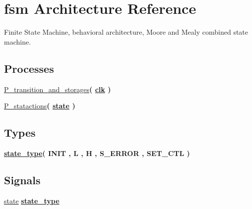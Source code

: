 \hypertarget{classstop__generator_1_1fsm}{}\section{fsm Architecture Reference}
\label{classstop__generator_1_1fsm}


Finite State Machine, behavioral architecture, Moore and Mealy combined state machine.  


\subsection*{Processes}
 \begin{DoxyCompactItemize}
\item 
\hyperlink{classstop__generator_1_1fsm_a99f8caf6038e841bdcf97ebb374b0de4}{P\+\_\+transition\+\_\+and\+\_\+storages}{\bfseries  ( {\bfseries {\bfseries \hyperlink{classstop__generator_a4a4609c199d30b3adebbeb3a01276ec5}{clk}} \textcolor{vhdlchar}{ }} )}
\item 
\hyperlink{classstop__generator_1_1fsm_a9ad00cfaa20b4e290a3d3ca73f332adb}{P\+\_\+statactions}{\bfseries  ( {\bfseries {\bfseries \hyperlink{classstop__generator_1_1fsm_ad5c908d9d78df85b2f0aa3b36b05c3a5}{state}} \textcolor{vhdlchar}{ }} )}
\end{DoxyCompactItemize}
\subsection*{Types}
 \begin{DoxyCompactItemize}
\item 
{\bfseries \hyperlink{classstop__generator_1_1fsm_aec03e7046c55ad7f97c414ee96c80e3f}{state\+\_\+type}{\bfseries \textcolor{vhdlchar}{(}\textcolor{vhdlchar}{ }\textcolor{vhdlchar}{I\+N\+IT}\textcolor{vhdlchar}{ }\textcolor{vhdlchar}{,}\textcolor{vhdlchar}{ }\textcolor{vhdlchar}{L}\textcolor{vhdlchar}{ }\textcolor{vhdlchar}{,}\textcolor{vhdlchar}{ }\textcolor{vhdlchar}{H}\textcolor{vhdlchar}{ }\textcolor{vhdlchar}{,}\textcolor{vhdlchar}{ }\textcolor{vhdlchar}{S\+\_\+\+E\+R\+R\+OR}\textcolor{vhdlchar}{ }\textcolor{vhdlchar}{,}\textcolor{vhdlchar}{ }\textcolor{vhdlchar}{S\+E\+T\+\_\+\+C\+TL}\textcolor{vhdlchar}{ }\textcolor{vhdlchar}{)}\textcolor{vhdlchar}{ }}} 
\end{DoxyCompactItemize}
\subsection*{Signals}
 \begin{DoxyCompactItemize}
\item 
\hyperlink{classstop__generator_1_1fsm_ad5c908d9d78df85b2f0aa3b36b05c3a5}{state} {\bfseries {\bfseries \hyperlink{classstop__generator_1_1fsm_aec03e7046c55ad7f97c414ee96c80e3f}{state\+\_\+type}} \textcolor{vhdlchar}{ }} 
\end{DoxyCompactItemize}


